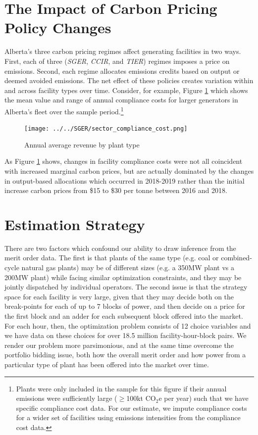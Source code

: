 \documentclass[12pt]{article}
\newcommand{\coe}{\text{CO$_2$e }}
\begin{document}
\section{The Impact of Carbon Pricing Policy Changes}

Alberta's three carbon pricing regimes affect generating facilities in two ways. First, each of three (\emph{SGER}, \emph{CCIR}, and \emph{TIER}) regimes imposes a price on emissions. Second, each regime allocates emissions credits based on output or deemed avoided emissions. The net effect of these policies creates variation within and across facility types over time.  Consider, for example, Figure \ref{fig:sector_compliance_cost} which shows the mean value and range of annual compliance costs for larger generators in Alberta's fleet over the sample period.\footnote{Plants were only included in the sample for this figure if their annual emissions were sufficiently large ($\geq$100kt CO$_2$e per year) such that we have specific compliance cost data. For our estimate, we impute compliance costs for a wider set of facilities using emissions intensities from the compliance cost data.}

\begin{figure}[!h]%
	\centering \vspace{-.25cm} \texttt{[image: ../../SGER/sector\_compliance\_cost.png]}
\vspace{-0.75cm}	\caption{Annual average revenue by plant type}
\label{fig:sector_compliance_cost}
\end{figure}

As Figure \ref{fig:sector_compliance_cost} shows, changes in facility compliance costs were not all coincident with increased marginal carbon prices, but are actually dominated by the changes in output-based allocations which occurred in 2018-2019 rather than the initial increase carbon prices from \$15 to \$30 per tonne \coe between 2016 and 2018.




\section{Estimation Strategy}
There are two factors which confound our ability to draw inference from the merit order data. The first is that plants of the same type (e.g. coal or combined-cycle natural gas plants) may be of different sizes (e.g. a 350MW plant vs a 200MW plant) while facing similar optimization constraints, and they may be jointly dispatched by individual operators. The second issue is that the strategy space for each facility is very large, given that they may decide both on the break-points for each of up to 7 blocks of power, and then decide on a price for the first block and an adder for each subsequent block offered into the market. For each hour, then, the optimization problem consists of 12 choice variables and we have data on these choices for over 18.5 million facility-hour-block pairs. We render our problem more parsimonious, and at the same time overcome the portfolio bidding issue, both how the overall merit order and how power from a particular type of plant has been offered into the market over time.
\end{document}
